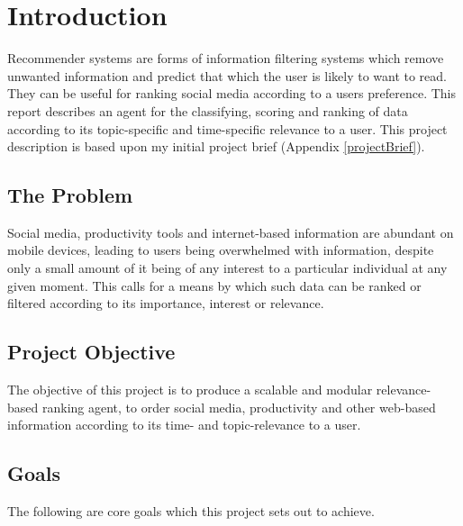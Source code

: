 \chapter{Introduction}

Recommender systems are forms of information filtering systems which remove unwanted information and predict that which the user is likely to want to read. They can be useful for ranking social media according to a users preference. This report describes an agent for the classifying, scoring and ranking of data according to its topic-specific and time-specific relevance to a user. This project description is based upon my initial project brief (Appendix \ref{projectBrief}).

\section{The Problem}

Social media, productivity tools and internet-based information are abundant on mobile devices, leading to users being overwhelmed with information, despite only a small amount of it being of any interest to a particular individual at any given moment. This calls for a means by which such data can be ranked or filtered according to its importance, interest or relevance.

\section{Project Objective}

The objective of this project is to produce a scalable and modular relevance-based ranking agent, to order social media, productivity and other web-based information according to its time- and topic-relevance to a user.

\section{Goals}

The following are core goals which this project sets out to achieve.

